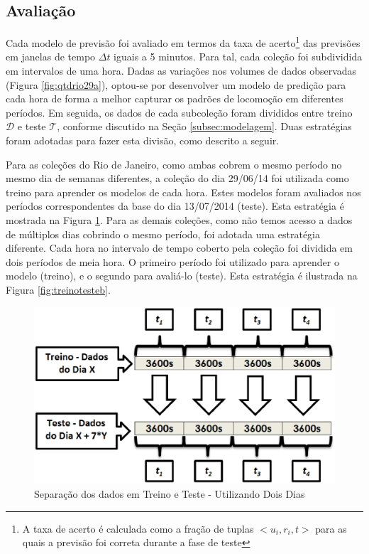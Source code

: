 \documentclass[10pt, a4paper, onecolumn, conference, compsocconf]{IEEEtran}
\begin{document}
\subsection{Avaliação}\label{subsec:methava}


Cada modelo de previsão foi avaliado em termos da taxa de acerto\footnote{A taxa de acerto é calculada como a fração de tuplas $<u_i,r_i,t>$ para as quais a previsão foi correta durante a fase de teste} das previsões em janelas de tempo $\Delta t$ iguais a 5 minutos.
Para tal, cada coleção foi  subdividida em intervalos de uma hora. Dadas as variações nos volumes de dados observadas  (Figura \ref{fig:qtdrio29a}), optou-se por desenvolver um modelo de predição para cada hora de forma a melhor capturar os padrões de locomoção em diferentes períodos. Em seguida, os dados de cada subcoleção foram divididos entre treino $\mathcal{D}$ e teste $\mathcal{T}$, conforme discutido na Seção \ref{subsec:modelagem}. Duas estratégias foram adotadas para fazer esta divisão, como descrito a seguir.

Para as coleções do Rio de Janeiro, como ambas cobrem o mesmo período no mesmo dia de semanas diferentes, a coleção do dia 29/06/14 foi utilizada como treino para aprender os modelos de cada hora. Estes modelos foram avaliados nos períodos correspondentes da base do dia 13/07/2014 (teste). Esta estratégia é mostrada na Figura \ref{fig:treinotestea}. Para as demais coleções, como não temos acesso a dados de múltiplos dias cobrindo o mesmo período,  foi adotada uma estratégia diferente. Cada hora no intervalo de tempo coberto pela coleção foi dividida em dois períodos de meia hora. O primeiro período foi utilizado para aprender o modelo (treino), e o segundo para avaliá-lo (teste). Esta estratégia é ilustrada na Figura \ref{fig:treinotesteb}.

  
\begin{figure}[ttt!]
\centering
\includegraphics[width=0.5\linewidth]{Graficos/treinoteste2dias.eps}
\caption{Separação dos dados em Treino e Teste - Utilizando Dois Dias}
\label{fig:treinotestea}
\end{figure}
\end{document}

